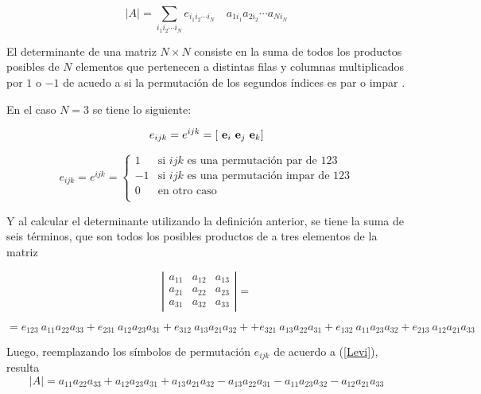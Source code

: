 $$\left  | A \right  | = \sum_{i_1 i_2  \cdots i_N} e_{i_1 i_2  \cdots i_N} \quad a_{1i_1} a_{2i_2}  \cdots a_{Ni_N}$$

El determinante de una matriz $N \times N$ consiste en la suma de todos los productos posibles de $N$ elementos que pertenecen a distintas filas y columnas  multiplicados por $1$ o $-1$ de acuedo a si la permutación de los segundos índices es par o impar
.


\bigskip

En el caso $N=3$ se tiene lo siguiente:

$$e_{ijk}=e^{ijk}= \left[  ~\bold{e}_i~\bold{e}_j~\bold{e}_k   \right] $$



\begin{equation}
\label{Levi}
 e_{ijk}=e^{ijk}=
\left\{ \begin{array} {lll} 
                    1 & \mbox{si $ijk$ es una permutación par de $123$}
\\
                    -1 & \mbox{si $ijk$ es una permutación impar de $123$}\\
										 0 & \mbox{en otro caso} \\
                    
                   \end{array}
           \right.
\end{equation}

\bigskip

Y al calcular el determinante utilizando la definición anterior, se tiene la suma de seis términos, que son  todos los posibles productos de a tres elementos de la matriz

\[
\left  | \begin{array}{ccc}
a_{11}  & a_{12}   & a_{13}  \\
a_{21}  &  a_{22}   &  a_{23}  \\
a_{31}  &  a_{32}   &  a_{33}  
\end{array}
\right|=
\]

\bigskip

$$
=e_{123}~a_{11}a_{22}a_{33}+ e_{231}~a_{12}a_{23}a_{31}+e_{312}~a_{13}a_{21}a_{32}+

+e_{321}~a_{13}a_{22}a_{31}+e_{132}~a_{11}a_{23}a_{32}+e_{213}~a_{12}a_{21}a_{33}
$$


\bigskip

Luego, reemplazando los símbolos de permutación $e_{ijk}$ de acuerdo a (\ref{Levi}), resulta 
\[
\left  | A \right  |= 
a_{11}a_{22}a_{33}+ a_{12}a_{23}a_{31}+a_{13}a_{21}a_{32}-a_{13}a_{22}a_{31}-a_{11}a_{23}a_{32}-a_{12}a_{21}a_{33}
\]


